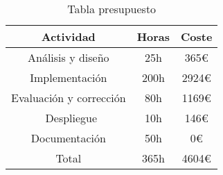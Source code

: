 \begin{table}[!ht]
    \begin{center} 
    \begin{tabular}{| c | c | c |}
    \hline
    \rowcolor{blueice}
    Actividad & Horas & Coste  \\ \hline
    Análisis y diseño & 25h & 365€\\
    Implementación & 200h &  2924€\\
    Evaluación y corrección & 80h & 1169€ \\ \
    Despliegue & 10h & 146€ \\ 
    Documentación & 50h & 0€ \\ \hline
    \rowcolor{gray30}
    Total & 365h & 4604€ \\ \hline
    \end{tabular}
    \caption{Tabla presupuesto}
    \label{tab:presupuesto}
    \end{center}
\end{table}


